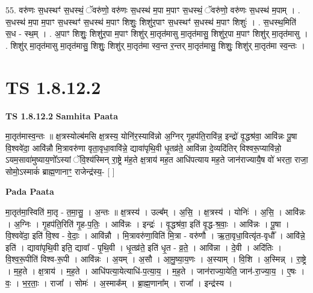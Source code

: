 \documentclass[17pt]{extarticle}
\begin{document}
55. वरु॑णः स॒धस्थꣳ॑ स॒धस्थं॒ ॅवरु॑णो॒ वरु॑णः स॒धस्थ॑ म॒पा म॒पाꣳ स॒धस्थं॒ ॅवरु॑णो॒ वरु॑णः स॒धस्थ॑ म॒पाम् । . स॒धस्थ॑ म॒पा म॒पाꣳ स॒धस्थꣳ॑ स॒धस्थ॑ म॒पाꣳ शिशुः॒ शिशु॑र॒पाꣳ स॒धस्थꣳ॑ स॒धस्थ॑ म॒पाꣳ शिशुः॑ । . स॒धस्थ॒मिति॑ स॒ध - स्थ॒म् । . अ॒पाꣳ शिशुः॒ शिशु॑र॒पा म॒पाꣳ शिशु॑र् मा॒तृत॑मासु मा॒तृत॑मासु॒ शिशु॑र॒पा म॒पाꣳ शिशु॑र् मा॒तृत॑मासु । . शिशु॑र् मा॒तृत॑मासु मा॒तृत॑मासु॒ शिशुः॒ शिशु॑र् मा॒तृत॑मा स्व॒न्त र॒न्तर् मा॒तृत॑मासु॒ शिशुः॒ शिशु॑र् मा॒तृत॑मा स्व॒न्तः । \newline
\pagebreak
{}

\section{ TS 1.8.12.2 }

\textbf{TS 1.8.12.2 } \newline
\textbf{Samhita Paata} \newline

मा॒तृत॑मास्व॒न्तः ॥ क्ष॒त्रस्योल्ब॑मसि क्ष॒त्रस्य॒ योनि॑र॒स्यावि॑न्नो अ॒ग्निर् गृ॒हप॑ति॒रावि॑न्न॒ इन्द्रो॑ वृ॒द्धश्र॑वा॒ आवि॑न्नः पू॒षा वि॒श्ववे॑दा॒ आवि॑न्नौ मि॒त्रावरु॑णा वृता॒वृधा॒वावि॑न्ने॒ द्यावा॑पृथि॒वी धृ॒तव्र॑ते॒ आवि॑न्ना दे॒व्यदि॑तिर् विश्वरू॒प्यावि॑न्नो॒ ऽयम॒सावा॑मुष्याय॒णो᳚ऽस्यां ॅवि॒श्य॑स्मिन् रा॒ष्ट्रे म॑ह॒ते क्ष॒त्राय॑ मह॒त आधि॑पत्याय मह॒ते जान॑राज्यायै॒ष वो॑ भरता॒ राजा॒ सोमो॒ऽस्माकं॑ ब्राह्म॒णानाꣳ॒॒ राजेन्द्र॑स्य॒- [ ] \newline

\textbf{Pada Paata} \newline

मा॒तृत॑मा॒स्विति॑ मा॒तृ - त॒मा॒सु॒ । अ॒न्तः ॥ क्ष॒त्रस्य॑ । उल्ब᳚म् । अ॒सि॒ । क्ष॒त्रस्य॑ । योनिः॑ । अ॒सि॒ । आवि॑न्नः । अ॒ग्निः । गृ॒हप॑ति॒रिति॑ गृ॒ह-प॒तिः॒ । आवि॑न्नः । इन्द्रः॑ । वृ॒द्धश्र॑वा॒ इति॑ वृ॒द्ध-श्र॒वाः॒ । आवि॑न्नः । पू॒षा । वि॒श्ववे॑दा॒ इति॑ वि॒श्व - वे॒दाः॒ । आवि॑न्नौ । मि॒त्रावरु॑णा॒विति॑ मि॒त्रा - वरु॑णौ । ऋ॒ता॒वृधा॒वित्यृ॑त-वृधौ᳚ । आवि॑न्ने॒ इति॑ । द्यावा॑पृथि॒वी इति॒ द्यावा᳚ - पृ॒थि॒वी । धृ॒तव्र॑ते॒ इति॑ धृ॒त - व्र॒ते॒ । आवि॑न्ना । दे॒वी । अदि॑तिः । वि॒श्व॒रू॒पीति॑ विश्व-रू॒पी । आवि॑न्नः । अ॒यम् । अ॒सौ । आ॒मु॒ष्या॒य॒णः । अ॒स्याम् । वि॒शि । अ॒स्मिन्न् । रा॒ष्ट्रे । म॒ह॒ते । क्ष॒त्राय॑ । म॒ह॒ते । आधि॑पत्या॒येत्याधि॑-प॒त्या॒य॒ । म॒ह॒ते । जान॑राज्या॒येति॒ जान॑-रा॒ज्या॒य॒ । ए॒षः । वः॒ । भ॒र॒ताः॒ । राजा᳚ । सोमः॑ । अ॒स्माक᳚म् । ब्रा॒ह्म॒णाना᳚म् । राजा᳚ । इन्द्र॑स्य ।  \newline
\end{document}
